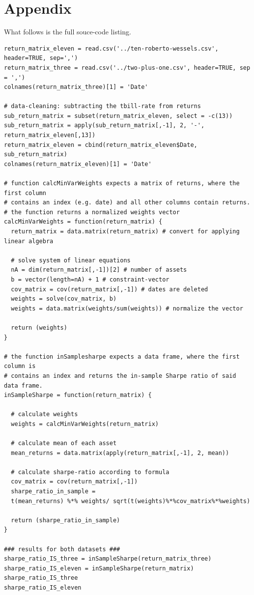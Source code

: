 \section{Appendix}
What follows is the full souce-code listing.
\begin{lstlisting}[label=code:full-source-code, frame=single]
return_matrix_eleven = read.csv('../ten-roberto-wessels.csv', header=TRUE, sep=',')
return_matrix_three = read.csv('../two-plus-one.csv', header=TRUE, sep = ',')
colnames(return_matrix_three)[1] = 'Date'

# data-cleaning: subtracting the tbill-rate from returns
sub_return_matrix = subset(return_matrix_eleven, select = -c(13))
sub_return_matrix = apply(sub_return_matrix[,-1], 2, '-', return_matrix_eleven[,13])
return_matrix_eleven = cbind(return_matrix_eleven$Date, sub_return_matrix)
colnames(return_matrix_eleven)[1] = 'Date'

# function calcMinVarWeights expects a matrix of returns, where the first column
# contains an index (e.g. date) and all other columns contain returns.
# the function returns a normalized weights vector
calcMinVarWeights = function(return_matrix) {
  return_matrix = data.matrix(return_matrix) # convert for applying linear algebra
  
  # solve system of linear equations
  nA = dim(return_matrix[,-1])[2] # number of assets
  b = vector(length=nA) + 1 # constraint-vector
  cov_matrix = cov(return_matrix[,-1]) # dates are deleted
  weights = solve(cov_matrix, b)
  weights = data.matrix(weights/sum(weights)) # normalize the vector
  
  return (weights)
}

# the function inSamplesharpe expects a data frame, where the first column is 
# contains an index and returns the in-sample Sharpe ratio of said data frame.
inSampleSharpe = function(return_matrix) {
  
  # calculate weights
  weights = calcMinVarWeights(return_matrix)
  
  # calculate mean of each asset
  mean_returns = data.matrix(apply(return_matrix[,-1], 2, mean)) 
  
  # calculate sharpe-ratio according to formula
  cov_matrix = cov(return_matrix[,-1])
  sharpe_ratio_in_sample = 
  t(mean_returns) %*% weights/ sqrt(t(weights)%*%cov_matrix%*%weights)
  
  return (sharpe_ratio_in_sample)
}

### results for both datasets ###
sharpe_ratio_IS_three = inSampleSharpe(return_matrix_three)
sharpe_ratio_IS_eleven = inSampleSharpe(return_matrix)
sharpe_ratio_IS_three
sharpe_ratio_IS_eleven


\end{lstlisting}
